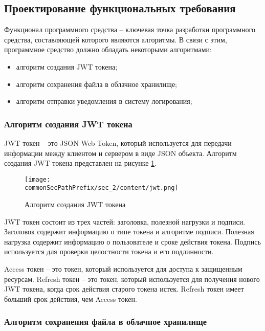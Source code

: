 \subsection{Проектирование функциональных требования}

Функционал программного средства – ключевая точка разработки программного средства, составляющей которого являются алгоритмы.
В связи с этим, программное средство {\taskNameFull} должно обладать некоторыми алгоритмами:
\begin{itemize}
    \item алгоритм создания JWT токена;
    \item алгоритм сохранения файла в облачное хранилище;
    \item алгоритм отправки уведомления в систему логирования;
\end{itemize}

\subsubsection{Алгоритм создания JWT токена}

JWT токен \cite{jwtDocs} -- это JSON Web Token, который используется для передачи информации между клиентом и сервером в виде JSON объекта.
Алгоритм создания JWT токена представлен на рисунке \ref{fig:jwt}.

\begin{figure}[ht]
    \centering
    \texttt{[image: \\commonSecPathPrefix/sec\_2/content/jwt.png]}
    \caption{Алгоритм создания JWT токена}
    \label{fig:jwt}
\end{figure}

JWT токен состоит из трех частей: заголовка, полезной нагрузки и подписи. Заголовок содержит информацию о типе токена и 
алгоритме подписи. Полезная нагрузка содержит информацию о пользователе и сроке действия токена. Подпись используется для проверки 
целостности токена и его подлинности.

Access токен -- это токен, который используется для доступа к защищенным ресурсам.
Refresh токен -- это токен, который используется для получения нового JWT токена, когда срок действия старого токена истек.
Refresh токен имеет больший срок действия, чем Access токен.

\subsubsection{Алгоритм сохранения файла в облачное хранилище}

